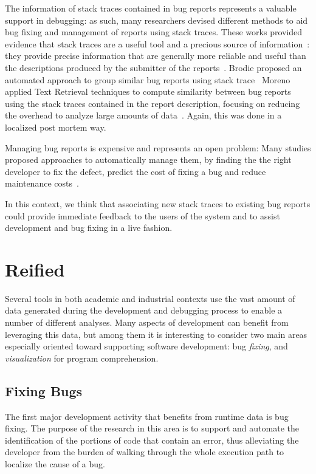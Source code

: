 The information of stack traces contained in bug reports represents a valuable support in debugging: as such, many researchers devised different methods to aid bug fixing and management of reports using stack traces.
These works provided evidence that stack traces are a useful tool and a precious source of information~\cite{Davie2013,Wang2013,Brod2005,Weis2007a}: they provide precise information that are generally more reliable and useful than the descriptions produced by the submitter of the reports~\cite{Ko2006}.
Brodie \etal proposed an automated approach to group similar bug reports using stack trace~\cite{Brod2005}
Moreno \etal applied Text Retrieval techniques to compute similarity between bug reports using the stack traces contained in the report description, focusing on reducing the overhead to analyze large amounts of data~\cite{Moreno2014}.
Again, this was done in a localized post mortem way.

Managing bug reports is expensive and represents an open problem: Many studies proposed approaches to automatically manage them, by finding the the right developer to fix the defect, predict the cost of fixing a bug and reduce maintenance costs~\cite{Matt2009,Anvi2006a,Sliw2005,DAmb2010c}.

In this context, we think that associating new stack traces to existing bug reports could provide immediate feedback to the users of the system and to assist development and bug fixing in a live fashion.




\section{Reified} \label{sec:related-reified}

Several tools in both academic and industrial contexts use the vast amount of data generated during the development and debugging process to enable a number of different analyses.
Many aspects of development can benefit from leveraging this data, but among them it is interesting to consider two main areas especially oriented toward supporting software development: bug \emph{fixing}, and \emph{visualization} for program comprehension.

\subsection{Fixing Bugs}

The first major development activity that benefits from runtime data is bug fixing.
The purpose of the research in this area is to support and automate the identification of the portions of code that contain an error, thus alleviating the developer from the burden of walking through the whole execution path to localize the cause of a bug.

